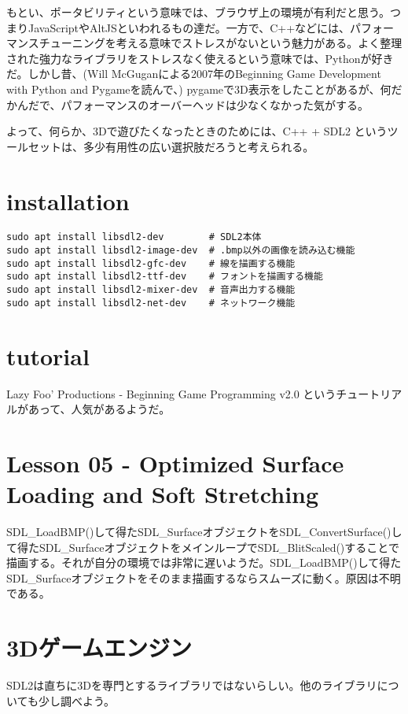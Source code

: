 \documentclass[uplatex,dvipdfmx]{jsarticle} \usepackage{amsmath,amssymb,bm}
\begin{document}
もとい、ポータビリティという意味では、ブラウザ上の環境が有利だと思う。つまりJavaScriptやAltJSといわれるもの達だ。一方で、C++などには、パフォーマンスチューニングを考える意味でストレスがないという魅力がある。よく整理された強力なライブラリをストレスなく使えるという意味では、Pythonが好きだ。しかし昔、(Will McGuganによる2007年のBeginning Game Development with Python and Pygameを読んで、) pygameで3D表示をしたことがあるが、何だかんだで、パフォーマンスのオーバーヘッドは少なくなかった気がする。

よって、何らか、3Dで遊びたくなったときのためには、C++ + SDL2 というツールセットは、多少有用性の広い選択肢だろうと考えられる。


\section*{installation}
\begin{verbatim}
sudo apt install libsdl2-dev        # SDL2本体
sudo apt install libsdl2-image-dev  # .bmp以外の画像を読み込む機能
sudo apt install libsdl2-gfc-dev    # 線を描画する機能
sudo apt install libsdl2-ttf-dev    # フォントを描画する機能
sudo apt install libsdl2-mixer-dev  # 音声出力する機能
sudo apt install libsdl2-net-dev    # ネットワーク機能
\end{verbatim}



\section*{tutorial}
Lazy Foo' Productions - Beginning Game Programming v2.0 というチュートリアルがあって、人気があるようだ。



\section*{Lesson 05 - Optimized Surface Loading and Soft Stretching}
SDL\_LoadBMP()して得たSDL\_SurfaceオブジェクトをSDL\_ConvertSurface()して得たSDL\_SurfaceオブジェクトをメインループでSDL\_BlitScaled()することで描画する。それが自分の環境では非常に遅いようだ。SDL\_LoadBMP()して得たSDL\_Surfaceオブジェクトをそのまま描画するならスムーズに動く。原因は不明である。



\section*{3Dゲームエンジン}
SDL2は直ちに3Dを専門とするライブラリではないらしい。他のライブラリについても少し調べよう。
\end{document}
